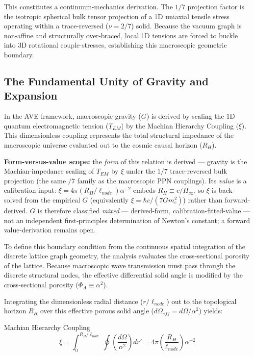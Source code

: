 This constitutes a continuum-mechanics derivation. The $1/7$ projection factor is the isotropic spherical bulk tensor projection of a 1D uniaxial tensile stress operating within a trace-reversed ($\nu=2/7$) solid. Because the vacuum graph is non-affine and structurally over-braced, local 1D tensions are forced to buckle into 3D rotational couple-stresses, establishing this macroscopic geometric boundary.

\subsection{The Fundamental Unity of Gravity and Expansion}

In the AVE framework, macroscopic gravity ($G$) is derived by scaling the 1D quantum electromagnetic tension ($T_{EM}$) by the Machian Hierarchy Coupling ($\xi$). This dimensionless coupling represents the total structural impedance of the macroscopic universe evaluated out to the cosmic causal horizon ($R_{H}$).

\textbf{Form-versus-value scope:} the \emph{form} of this relation is derived --- gravity is the Machian-impedance scaling of $T_{EM}$ by $\xi$ under the $1/7$ trace-reversed bulk projection (the same $/7$ family as the macroscopic PPN couplings). Its \emph{value} is a calibration input: $\xi=4\pi(R_{H}/\ell_{node})\alpha^{-2}$ embeds $R_{H}\equiv c/H_{\infty}$, so $\xi$ is back-solved from the empirical $G$ (equivalently $\xi=\hbar c/(7Gm_{e}^{2})$) rather than forward-derived. $G$ is therefore classified \emph{mixed} --- derived-form, calibration-fitted-value --- not an independent first-principles determination of Newton's constant; a forward value-derivation remains open.

To define this boundary condition from the continuous spatial integration of the discrete lattice graph geometry, the analysis evaluates the cross-sectional porosity of the lattice. Because macroscopic wave transmission must pass through the discrete structural nodes, the effective differential solid angle is modified by the cross-sectional porosity ($\Phi_{A}\equiv\alpha^{2}$).

Integrating the dimensionless radial distance ($r/\ell_{node}$) out to the topological horizon $R_{H}$ over this effective porous solid angle ($d\Omega_{eff}=d\Omega/\alpha^{2}$) yields:

\begin{resultbox}{Machian Hierarchy Coupling}
\begin{equation}
\xi=\int_{0}^{R_{H}/\ell_{node}}\oint\left(\frac{d\Omega}{\alpha^{2}}\right)dr'=4\pi\left(\frac{R_{H}}{\ell_{node}}\right)\alpha^{-2}
\end{equation}
\end{resultbox}

